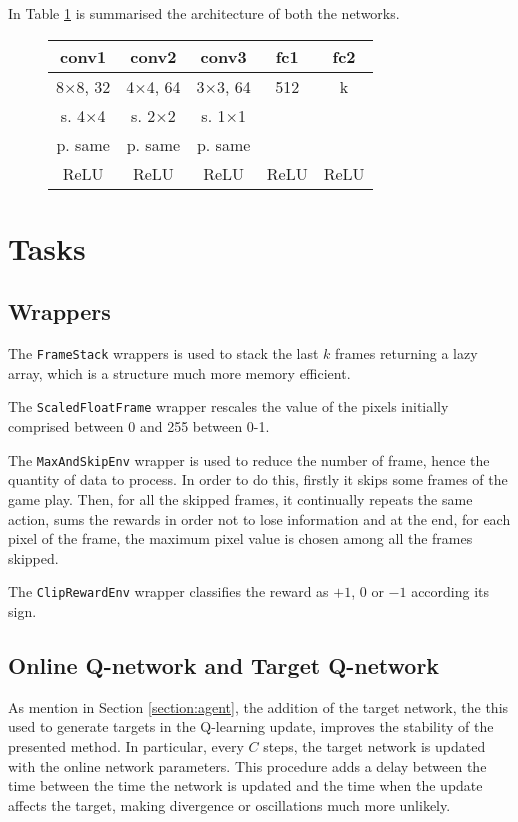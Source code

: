 \documentclass[a4paper,12pt]{article} %
\begin{document}
	In Table \ref{tab:arc} is summarised the architecture of both the networks. 
	
	\begin{figure}[htb]
		\centering
		
		\begin{tabular}{ccccc}
			\toprule
			\textbf{conv1} & \textbf{conv2} & \textbf{conv3} & \textbf{fc1} &
			\textbf{fc2} \\
			\midrule
			8$\times$8,  32 & 4$\times$4, 64 & 3$\times$3, 64 & 512 & k\\
			s. 4$\times$4 &   s. 2$\times$2 &   s. 1$\times$1 &  & \\
			p. same & p. same & p. same &&\\
			ReLU & ReLU & ReLU & ReLU & ReLU  \\
			\bottomrule
		\end{tabular}
		\label{tab:arc}
	\end{figure}
	
	
	\section{Tasks}
	\label{section:tasks}
	
	\subsection{Wrappers}
	The \texttt{FrameStack} wrappers is used to stack the last $k$ frames returning a lazy array, which is a structure much more memory efficient.

	The \texttt{ScaledFloatFrame} wrapper rescales the value of the pixels initially comprised between 0 and 255 between 0-1.
	
	The \texttt{MaxAndSkipEnv} wrapper is used to reduce the number of frame, hence the quantity of data to process. In order to do this, firstly it skips some frames of the game play. Then, for all the skipped frames, it continually repeats the same action, sums the rewards in order not to lose information and at the end, for each pixel of the frame, the maximum pixel value is chosen among all the frames skipped.
	 	 
	The \texttt{ClipRewardEnv} wrapper classifies the reward as $+1$, $0$ or $-1$ according its sign.

	
	\subsection{Online Q-network and Target Q-network}	
	As mention in Section \ref{section:agent}, the addition of the target network, the this used to generate targets in the Q-learning update, improves the stability of the presented method. In particular, every $C$ steps, the target network is updated with the online network parameters.
	This procedure adds a delay between the time between the time the network is updated and the time when the update affects the target, making divergence or oscillations much more unlikely.
	
\end{document}
